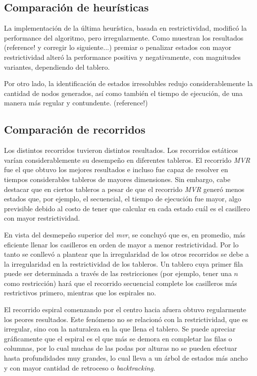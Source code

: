 \documentclass[%
    final,
    reprint,
    notitlepage,
    narroweqnarray,
    inline,
    twoside,
    invited
    ]{ieee}
\begin{document}
\subsection{Comparación de heurísticas}


\par La implementación de la última heurística, basada en restrictividad, modificó la performance del algoritmo, pero irregularmente. 
Como muestran los resultados (reference! y corregir lo siguiente...) premiar o penalizar estados con mayor restrictividad alteró la performance 
positiva y negativamente, con magnitudes variantes, dependiendo del tablero. 
\par Por otro lado, la identificación de estados irresolubles redujo considerablemente la cantidad de nodos generados, así como también el tiempo de ejecución, 
de una manera más regular y contundente.
(reference!)

\subsection{Comparación de recorridos}

\par  Los distintos recorridos tuvieron distintos resultados. Los recorridos estáticos varían considerablemente su desempeño en diferentes tableros. El 
recorrido \textit{MVR} fue el que obtuvo los mejores resultados e incluso fue capaz de resolver en tiempos considerables tableros de mayores dimensiones. 
Sin embargo, cabe destacar que en ciertos tableros a pesar de que el recorrido \textit{MVR} generó menos estados que, por ejemplo, el secuencial, el tiempo de ejecución 
fue mayor, algo previsible debido al costo de tener que calcular en cada estado cuál es el casillero con mayor restrictividad. 
\par En vista del desmepeño superior 
del \textit{mvr}, se concluyó que es, en promedio, más eficiente llenar los casilleros en orden de mayor a menor restrictividad.
Por lo tanto se conllevó a plantear que la irregularidad de los otros recorridos se debe a la irregularidad en la restrictividad de los tableros. 
Un tablero cuya primer fila puede ser determinada a través de las restricciones (por ejemplo, tener una $n$ como restricción) hará que el recorrido secuencial 
complete los casilleros más restrictivos primero, mientras que los espirales no.
\par El recorrido espiral comenzando por el centro hacia afuera obtuvo regularmente los peores resultados. Este fenómeno no se relacionó con la restrictividad, 
que es irregular, sino con la naturaleza en la que llena el tablero. Se puede apreciar gráficamente que el espiral es el que más se demora en completar las filas 
o columnas, por lo cual muchas de las podas por alturas no se pueden efectuar hasta profundidades muy grandes, lo cual lleva a un árbol de estados más ancho y 
con mayor cantidad de retroceso o \textit{backtracking}.
\end{document}
